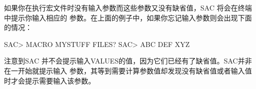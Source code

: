 如果你在执行宏文件时没有输入参数而这些参数又没有缺省值，SAC 将会在终端中提示你输入相应的
参数。在上面的例子中，如果你忘记输入参数则会出现下面的情况：
\begin{SACCode}
SAC> MACRO MYSTUFF
FILES?
SAC> ABC DEF XYZ 
\end{SACCode}
注意到SAC 并不会提示输入VALUES的值，因为它们已经有了缺省值。SAC并非在一开始就提示输入
参数，其等到需要计算参数值却发现没有缺省值或者输入值时才会提示需要输入该参数。
